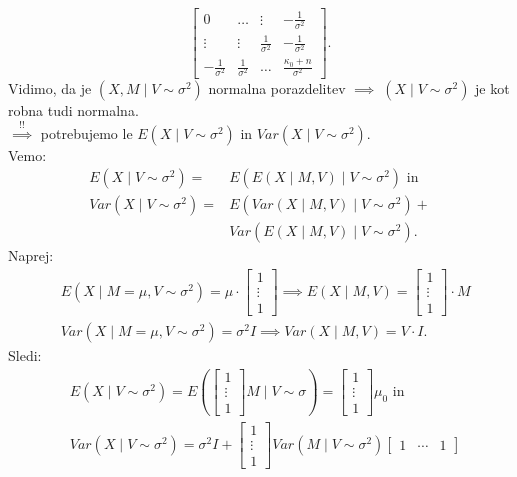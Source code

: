 \documentclass[a4paper, 12pt]{book}
\theoremstyle{definition}
\theoremstyle{remark}
\begin{document}
\begin{enumerate}[label=(\roman*)]
\begin{equation*}
\begin{bmatrix}
        0 & \dots & \vdots & -\frac{1}{\sigma^2} \\
        \vdots & \vdots & \frac{1}{\sigma^2} & -\frac{1}{\sigma^2} \\
        -\frac{1}{\sigma^2} & \frac{1}{\sigma^2} & \dots & \frac{\kappa_0 + n}{\sigma^2}
      \end{bmatrix}.
    \end{equation*}
    Vidimo, da je $(X, M \mid V \sim \sigma^2)$ normalna porazdelitev $\implies \; (X \mid V \sim \sigma^2)$ je kot robna tudi normalna. \\
    $\stackrel{!!}{\implies}$ potrebujemo le $E(X \mid V \sim \sigma^2)$ in $Var(X \mid V \sim \sigma^2)$. \\
    Vemo:
    \begin{align*}
      E(X \mid V \sim \sigma^2) =& E(E(X \mid M, V) \mid V \sim \sigma^2) \text{ in} \\
      Var(X \mid V \sim \sigma^2) =& E(Var(X \mid M, V) \mid V \sim \sigma^2) + \\
      &Var(E(X \mid M, V) \mid V \sim \sigma^2).
    \end{align*}
    Naprej:
    \begin{align*}
      &E(X \mid M = \mu, V \sim \sigma^2) = \mu \cdot \begin{bmatrix}1\\\vdots\\1\end{bmatrix}
        \implies E(X \mid M, V) = \begin{bmatrix}1\\\vdots\\1\end{bmatrix} \cdot M \\
      &Var(X \mid M = \mu, V \sim \sigma^2) = \sigma^2 I \implies Var(X \mid M, V) = V \cdot I.
    \end{align*}
    Sledi:
    \begin{align*}
      &E(X \mid V \sim \sigma^2) = E\left(\begin{bmatrix}1\\\vdots\\1\end{bmatrix} M \mid V \sim \sigma\right) =
        \begin{bmatrix}1\\\vdots\\1\end{bmatrix} \mu_0 \text{ in} \\
      &Var(X \mid V \sim \sigma^2) = \sigma^2 I +
        \begin{bmatrix}1\\\vdots\\1\end{bmatrix} Var(M \mid V \sim \sigma^2) \begin{bmatrix}1&\cdots&1\end{bmatrix} \\

\end{align*}
\end{enumerate}
\end{document}
